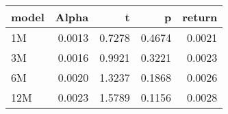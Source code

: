 \begin{table}[ht]
\centering
\begin{tabular}{lrrrr}
  \hline
model & Alpha & t & p & return \\ 
  \hline
1M & 0.0013 & 0.7278 & 0.4674 & 0.0021 \\ 
  3M & 0.0016 & 0.9921 & 0.3221 & 0.0023 \\ 
  6M & 0.0020 & 1.3237 & 0.1868 & 0.0026 \\ 
  12M & 0.0023 & 1.5789 & 0.1156 & 0.0028 \\ 
   \hline
\end{tabular}
\end{table}

